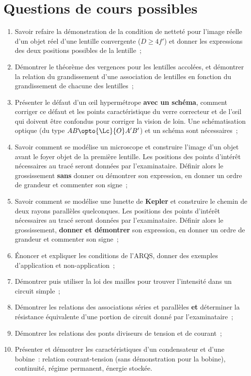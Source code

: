 \documentclass[a4paper, 12pt, final, garamond]{book}
\begin{document}
\section{Questions de cours possibles}
\begin{enumerate}
    \item Savoir refaire la démonstration de la condition de netteté pour
        l'image réelle d'un objet réel d'une lentille convergente ($D \geq 4f'$)
        et donner les expressions des deux positions possibles de la lentille~;
    \item Démontrer le théorème des vergences pour les lentilles accolées, et
        démontrer la relation du grandissement d'une association de lentilles en
        fonction du grandissement de chacune des lentilles~;
    \item Présenter le défaut d'un œil hypermétrope \textbf{avec un schéma},
        comment corriger ce défaut et les points caractéristique du verre
        correcteur et de l'œil qui doivent être confondus pour corriger la
        vision de loin. Une schématisation optique (du type $AB \opto{\Lc}{O}
        A'B'$) et un schéma sont nécessaires~;
    \item Savoir comment se modélise un microscope et construire l'image d'un
        objet avant le foyer objet de la première lentille. Les positions des
        points d'intérêt nécessaires au tracé seront données par l'examinataire.
        Définir alors le grossissement \textbf{sans} donner ou démontrer son
        expression, en donner un ordre de grandeur et commenter son signe~;
    \item Savoir comment se modélise une lunette de \textbf{Kepler} et
        construire le chemin de deux rayons parallèles quelconques. Les
        positions des points d'intérêt nécessaires au tracé seront données par
        l'examinataire. Définir alors le grossissement, \textbf{donner et
        démontrer} son expression, en donner un ordre de grandeur et commenter
        son signe~;
    \item Énoncer et expliquer les conditions de l'ARQS, donner des exemples
        d'application et non-application~;
    \item Démontrer puis utiliser la loi des mailles pour trouver l'intensité
        dans un circuit simple~;
    \item Démontrer les relations des associations séries et parallèles
        \textbf{et} déterminer la résistance équivalente d'une portion de
        circuit donné par l'examinataire~;
    \item Démontrer les relations des ponts diviseurs de tension et de courant~;
    \item Présenter et démontrer les caractéristiques d'un condensateur et d'une
        bobine~: relation courant-tension (sans démonstration pour la bobine),
        continuité, régime permanent, énergie stockée.
\end{enumerate}
\end{document}
